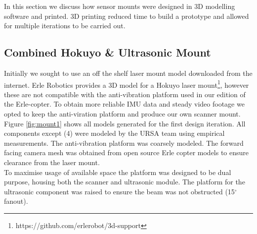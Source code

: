 \documentclass[capstone_report.tex]{subfiles}
\begin{document}
In this section we discuss how sensor mounts were designed in 3D modelling software and printed. 3D printing reduced time to build a prototype and allowed for multiple iterations to be carried out.

\subsection{Combined Hokuyo \& Ultrasonic Mount}
Initially we sought to use an off the shelf laser mount model downloaded from the internet. Erle Robotics provides a 3D model for a Hokuyo laser mount\footnote{https://github.com/erlerobot/3d-support}, however these are not compatible with the anti-vibration platform used in our edition of the Erle-copter. To obtain more reliable IMU data and steady video footage we opted to keep the anti-viration platform and produce our own scanner mount.\\

Figure \ref{fig:mount1} shows all models generated for the first design iteration.  All components except (4) were modeled by the URSA team using empirical measurements. The anti-vibration platform was coarsely modeled. The forward facing camera mesh was obtained from open source Erle copter models to ensure clearance from the laser mount.\\

To maximise usage of available space the platform was designed to be dual purpose, housing both the scanner and ultrasonic module.  The platform for the ultrasonic component was raised to ensure the beam was not obstructed (15$^\circ$ fanout).
\end{document}
